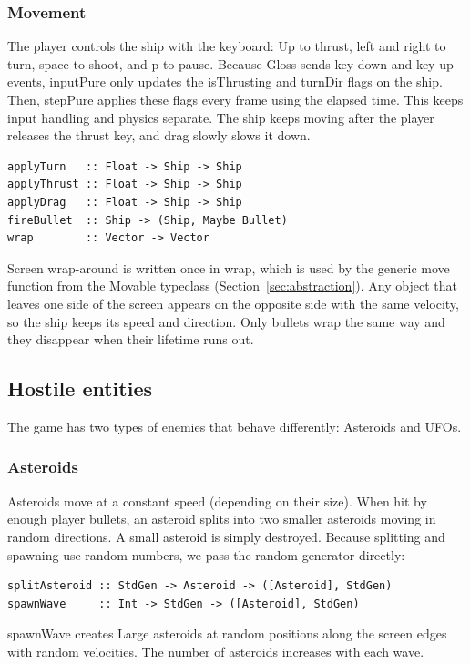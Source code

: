\documentclass{article}
\begin{document}
\subsubsection{Movement}
The player controls the ship with the keyboard: Up to thrust, left and right to turn, space to shoot, and p to pause. Because Gloss sends key-down and key-up events, inputPure only updates the isThrusting and turnDir flags on the ship. Then, stepPure applies these flags every frame using the elapsed time. This keeps input handling and physics separate. The ship keeps moving after the player releases the thrust key, and drag slowly slows it down.
\begin{lstlisting}
applyTurn   :: Float -> Ship -> Ship
applyThrust :: Float -> Ship -> Ship
applyDrag   :: Float -> Ship -> Ship
fireBullet  :: Ship -> (Ship, Maybe Bullet)
wrap        :: Vector -> Vector
\end{lstlisting}
Screen wrap-around is written once in wrap, which is used by the generic move function from the Movable typeclass (Section~\ref{sec:abstraction}). Any object that leaves one side of the screen appears on the opposite side with the same velocity, so the ship keeps its speed and direction. Only bullets wrap the same way and they disappear when their lifetime runs out.

\subsection{Hostile entities}\label{sec:hostile}
The game has two types of enemies that behave differently: Asteroids and UFOs.

\subsubsection{Asteroids}
Asteroids move at a constant speed (depending on their size). When hit by enough player bullets, an asteroid splits into two smaller asteroids moving in random directions. A small asteroid is simply destroyed. Because splitting and spawning use random numbers, we pass the random generator directly:
\begin{lstlisting}
splitAsteroid :: StdGen -> Asteroid -> ([Asteroid], StdGen)
spawnWave     :: Int -> StdGen -> ([Asteroid], StdGen)
\end{lstlisting}
spawnWave creates Large asteroids at random positions along the screen edges with random velocities. The number of asteroids increases with each wave.
\end{document}
